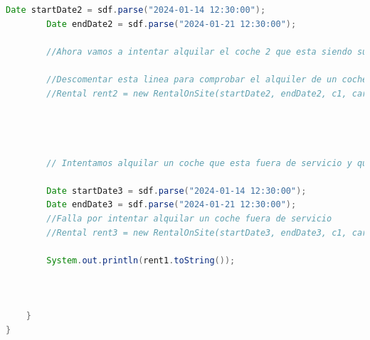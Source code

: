 \begin{lstlisting}[style = javaNormal, language=Java]
        Date startDate2 = sdf.parse("2024-01-14 12:30:00");
        Date endDate2 = sdf.parse("2024-01-21 12:30:00");

        //Ahora vamos a intentar alquilar el coche 2 que esta siendo sustituto del coche 1

        //Descomentar esta linea para comprobar el alquiler de un coche sustituto
        //Rental rent2 = new RentalOnSite(startDate2, endDate2, c1, car2, office1);




        // Intentamos alquilar un coche que esta fuera de servicio y que not tiene sustituto:

        Date startDate3 = sdf.parse("2024-01-14 12:30:00");
        Date endDate3 = sdf.parse("2024-01-21 12:30:00");
        //Falla por intentar alquilar un coche fuera de servicio
        //Rental rent3 = new RentalOnSite(startDate3, endDate3, c1, car3, office1);

        System.out.println(rent1.toString());



    }
}
\end{lstlisting}
